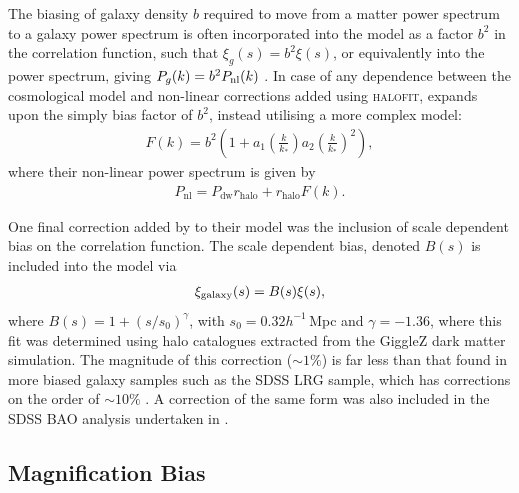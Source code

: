 \documentclass[titlesmallcaps, examinerscopy, copyrightpage]{uqthesis}
\newcommand{\halofit}{\textsc{halofit}}
\begin{document}
The biasing of galaxy density $b$ required to move from a matter power spectrum to a galaxy power spectrum is often incorporated into the model as a factor $b^2$ in the correlation function, such that $\xi_g(s) = b^2 \xi(s)$, or equivalently into the power spectrum, giving $P_g(k) = b^2 P_{\rm{nl}}(k)$ \citep{BlakeDavis2011, ChuangWang2012, XuPadmanabhan2012, AndersonAubourg2012, MontesanoSanchezPhelps2012}. In case of any dependence between the cosmological model and non-linear corrections added using \halofit{}, \citet{ReidPercival2010} expands upon the simply bias factor of $b^2$, instead utilising a more complex model:
\begin{align}
F(k) = b^2\left(1 + a_1 \left(\frac{k}{k_*}\right) a_2 \left( \frac{k}{k_*} \right)^2 \right),
\end{align}
where their non-linear power spectrum is given by 
\begin{align}
P_{\text{nl}} = P_{\text{dw}} r_{\text{halo}} + r_{\text{halo}} F(k).
\end{align}

One final correction added by \citet{BlakeDavis2011} to their model was the inclusion of scale dependent bias on the correlation function. The scale dependent bias, denoted $B(s)$ is included into the model via
\begin{align}
\xi_{\rm{galaxy}}(s) = B(s) \xi(s),
\end{align}
where $B(s) = 1 + (s/s_0)^\gamma$, with $s_0 = 0.32 h^{-1}\,$Mpc and $\gamma = -1.36$, where this fit was determined using halo catalogues extracted from the GiggleZ dark matter simulation. The magnitude of this correction ($\sim 1\%$) is far less than that found in more biased galaxy samples such as the SDSS LRG sample, which has corrections on the order of $\sim 10\%$ \citep{EisensteinZehavi2005}. A correction of the same form was also included in the SDSS BAO analysis undertaken in \citet{VeropalumboMarulliMoscardini2014}.


\subsection{Magnification Bias}
\end{document}
